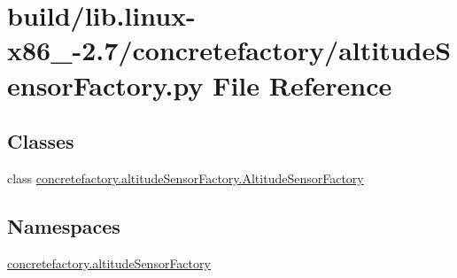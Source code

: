 \hypertarget{build_2lib_8linux-x86__64-2_87_2concretefactory_2altitudeSensorFactory_8py}{}\section{build/lib.linux-\/x86\+\_-\/2.7/concretefactory/altitude\+Sensor\+Factory.py File Reference}
\label{build_2lib_8linux-x86__64-2_87_2concretefactory_2altitudeSensorFactory_8py}
\subsection*{Classes}
\begin{DoxyCompactItemize}
\item 
class \hyperlink{classconcretefactory_1_1altitudeSensorFactory_1_1AltitudeSensorFactory}{concretefactory.\+altitude\+Sensor\+Factory.\+Altitude\+Sensor\+Factory}
\end{DoxyCompactItemize}
\subsection*{Namespaces}
\begin{DoxyCompactItemize}
\item 
 \hyperlink{namespaceconcretefactory_1_1altitudeSensorFactory}{concretefactory.\+altitude\+Sensor\+Factory}
\end{DoxyCompactItemize}
